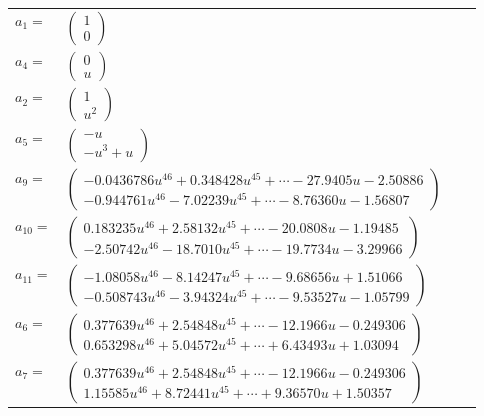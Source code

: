 \documentclass[1p]{elsarticle_modified}
\theoremstyle{definition}
\begin{document}
\begin{tabular}{m{7pt} m{180pt} m{7pt} m{180pt} }
\flushright $a_{1}=$&$\begin{pmatrix}1\\0\end{pmatrix}$ \\
\flushright $a_{4}=$&$\begin{pmatrix}0\\u\end{pmatrix}$ \\
\flushright $a_{2}=$&$\begin{pmatrix}1\\u^2\end{pmatrix}$ \\
\flushright $a_{5}=$&$\begin{pmatrix}- u\\- u^3+u\end{pmatrix}$ \\
\flushright $a_{9}=$&$\begin{pmatrix}-0.0436786 u^{46}+0.348428 u^{45}+\cdots-27.9405 u-2.50886\\-0.944761 u^{46}-7.02239 u^{45}+\cdots-8.76360 u-1.56807\end{pmatrix}$ \\
\flushright $a_{10}=$&$\begin{pmatrix}0.183235 u^{46}+2.58132 u^{45}+\cdots-20.0808 u-1.19485\\-2.50742 u^{46}-18.7010 u^{45}+\cdots-19.7734 u-3.29966\end{pmatrix}$ \\
\flushright $a_{11}=$&$\begin{pmatrix}-1.08058 u^{46}-8.14247 u^{45}+\cdots-9.68656 u+1.51066\\-0.508743 u^{46}-3.94324 u^{45}+\cdots-9.53527 u-1.05799\end{pmatrix}$ \\
\flushright $a_{6}=$&$\begin{pmatrix}0.377639 u^{46}+2.54848 u^{45}+\cdots-12.1966 u-0.249306\\0.653298 u^{46}+5.04572 u^{45}+\cdots+6.43493 u+1.03094\end{pmatrix}$ \\
\flushright $a_{7}=$&$\begin{pmatrix}0.377639 u^{46}+2.54848 u^{45}+\cdots-12.1966 u-0.249306\\1.15585 u^{46}+8.72441 u^{45}+\cdots+9.36570 u+1.50357\end{pmatrix}$ \\

\end{tabular}
\end{document}
